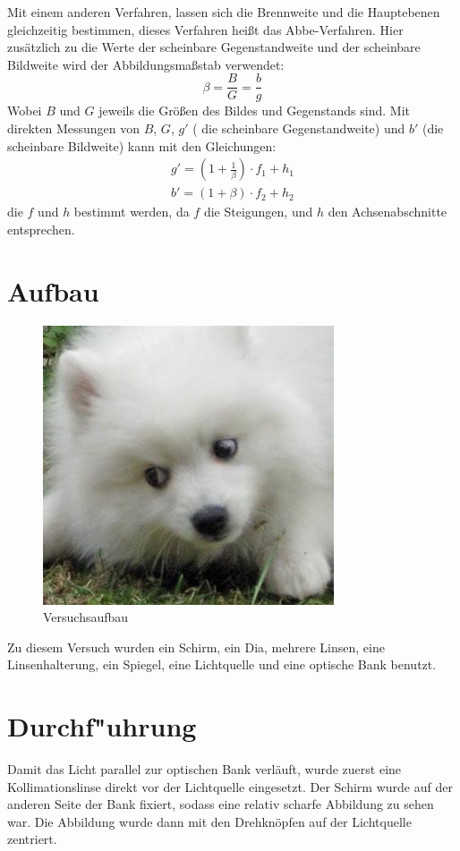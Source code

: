 \documentclass[11pt,a4paper]{article}
\begin{document}
Mit einem anderen Verfahren, lassen sich die Brennweite und die Hauptebenen gleichzeitig bestimmen, dieses Verfahren heißt das Abbe-Verfahren. Hier zusätzlich zu die Werte der scheinbare Gegenstandweite und der scheinbare Bildweite wird  der Abbildungsmaßstab verwendet: 
$$ \beta = \frac{B}{G} = \frac{b}{g}$$
Wobei $B$ und $G$ jeweils die Größen des Bildes und Gegenstands sind. 
Mit direkten Messungen von $B$, $G$, $g'$ ( die scheinbare Gegenstandweite) und $b'$ (die scheinbare Bildweite) kann mit den Gleichungen:
\begin{equation}
\begin{array}{l}
	g' = (1+\frac{1}{\beta})\cdot f_1 + h_1 \\
	b' = (1+\beta)\cdot f_2 + h_2
\end{array}
\end{equation}
die $f$ und $h$ bestimmt werden, da $f$ die Steigungen, und $h$ den Achsenabschnitte entsprechen. 



\section{Aufbau}
\begin{figure}[h]
	\centering
	\includegraphics[scale=1]{ver70}
	\caption{Versuchsaufbau}
\end{figure}
Zu diesem Versuch wurden ein Schirm, ein Dia, mehrere Linsen, eine Linsenhalterung, ein Spiegel, eine Lichtquelle und eine optische Bank benutzt. 

\section{Durchf"uhrung}
Damit das Licht parallel zur optischen Bank verläuft, wurde zuerst eine Kollimationslinse direkt vor der Lichtquelle eingesetzt. Der Schirm wurde auf der anderen Seite der Bank fixiert, sodass eine relativ scharfe Abbildung zu sehen war. Die Abbildung wurde dann mit den Drehknöpfen auf der Lichtquelle zentriert. 
\end{document}
